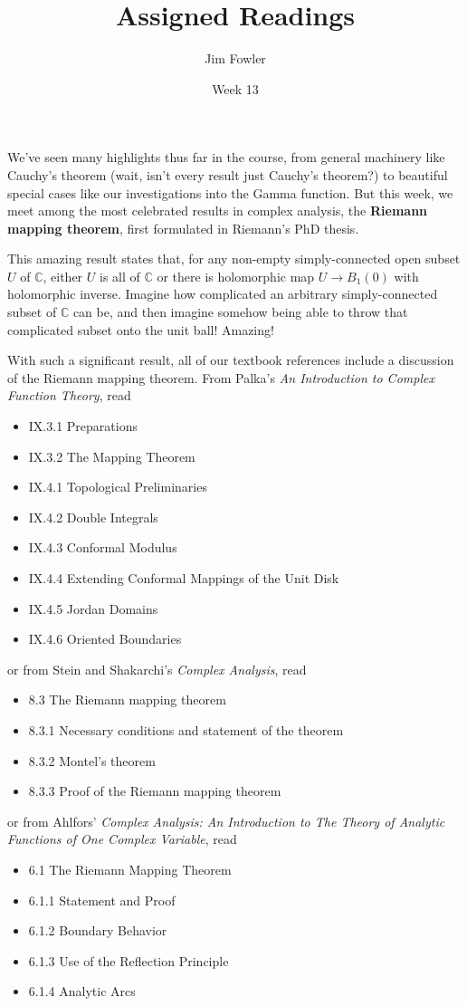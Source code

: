 \documentclass{homework}
\author{Jim Fowler}
\title{Assigned Readings}
\date{Week 13}
\begin{document}
\maketitle

We've seen many highlights thus far in the course, from general
machinery like Cauchy's theorem (wait, isn't every result just
Cauchy's theorem?) to beautiful special cases like our investigations
into the Gamma function.  But this week, we meet among the most
celebrated results in complex analysis, the \textbf{Riemann mapping
  theorem}, first formulated in Riemann's PhD thesis.

This amazing result states that, for any non-empty simply-connected
open subset $U$ of $\mathbb{C}$, either $U$ is all of $\mathbb{C}$ or there is
holomorphic map $U \to B_1(0)$ with holomorphic inverse.  Imagine how
complicated an arbitrary simply-connected subset of $\mathbb{C}$ can be, and
then imagine somehow being able to throw that complicated subset onto
the unit ball!  Amazing!

With such a significant result, all of our textbook references include
a discussion of the Riemann mapping theorem.  From Palka's \textit{An
  Introduction to Complex Function Theory}, read
\begin{itemize}
\item IX.3.1 Preparations
\item IX.3.2 The Mapping Theorem
\item IX.4.1 Topological Preliminaries
\item IX.4.2 Double Integrals
\item IX.4.3 Conformal Modulus
\item IX.4.4 Extending Conformal Mappings of the Unit Disk
\item IX.4.5 Jordan Domains
\item IX.4.6 Oriented Boundaries
\end{itemize}
or from Stein and Shakarchi's \textit{Complex Analysis}, read
\begin{itemize}
\item 8.3 The Riemann mapping theorem
\item 8.3.1 Necessary conditions and statement of the theorem
\item 8.3.2 Montel's theorem
\item 8.3.3 Proof of the Riemann mapping theorem
\end{itemize}
or from Ahlfors' \textit{Complex Analysis: An Introduction to The Theory of Analytic Functions of One Complex Variable}, read
\begin{itemize}
\item 6.1 The Riemann Mapping Theorem
\item 6.1.1 Statement and Proof
\item 6.1.2 Boundary Behavior
\item 6.1.3 Use of the Reflection Principle
\item 6.1.4 Analytic Arcs
\end{itemize}
\end{document}
